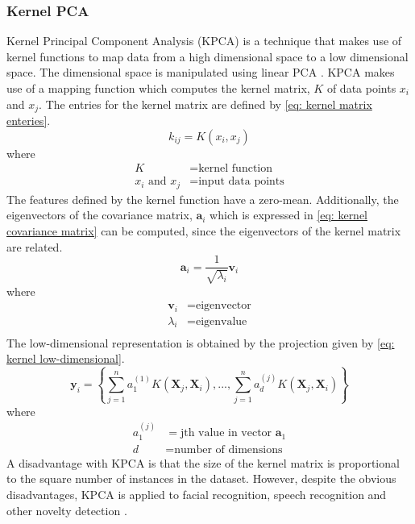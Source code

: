 \documentclass[11pt]{article}
\begin{document}
	\subsubsection{Kernel PCA}
	Kernel Principal Component Analysis (KPCA) is a technique that makes use of kernel functions to map data from a high dimensional space to a low dimensional space. The dimensional space is manipulated using linear PCA \cite{Cui2012}. KPCA makes use of a mapping function which computes the kernel matrix, $K$ of data points $x_i$ and $x_j$. The entries for the kernel matrix are defined by \eqref{eq: kernel matrix enteries}.
	\begin{equation}
		k_{ij} = K(x_i, x_j)
		\label{eq: kernel matrix enteries}
	\end{equation}
	where
	\begin{align*}
		K &= \text{kernel function}\\
		x_i \text{ and } x_j &= \text{input data points}
	\end{align*}
	The features defined by the kernel function have a zero-mean. Additionally, the eigenvectors of the covariance matrix, $\textbf{a}_i$ which is expressed in \eqref{eq: kernel covariance matrix} can be computed, since the eigenvectors of the kernel matrix are related. 
	\begin{equation}
		\textbf{a}_i = \frac{1}{\sqrt{\lambda_i}} \textbf{v}_i
		\label{eq: kernel covariance matrix}
	\end{equation}
	where
	\begin{align*}
		\textbf{v}_i &= \text{eigenvector} \\
		\lambda_i &= \text{eigenvalue}\\
	\end{align*}
	The low-dimensional representation is obtained by the projection given by \eqref{eq: kernel low-dimensional}.
	\begin{equation}
		\textbf{y}_i = \left\{ \sum_{j = 1}^{n}a_1^{(1)}K(\textbf{X}_j, \textbf{X}_i), ... , \sum_{j = 1}^{n}a_d^{(j)}K(\textbf{X}_j, \textbf{X}_i) \right\}
		\label{eq: kernel low-dimensional}
	\end{equation}
	where
	\begin{align*}
		a_1^{(j)} &= \text{jth value in vector }\textbf{a}_1\\
		d &= \text{number of dimensions}
	\end{align*}
	A disadvantage with KPCA is that the size of the kernel matrix is proportional to the square number of instances in the dataset. However, despite the obvious disadvantages, KPCA is applied to facial recognition, speech recognition and other novelty detection \cite{van2009dimensionality}.
	
\end{document}
